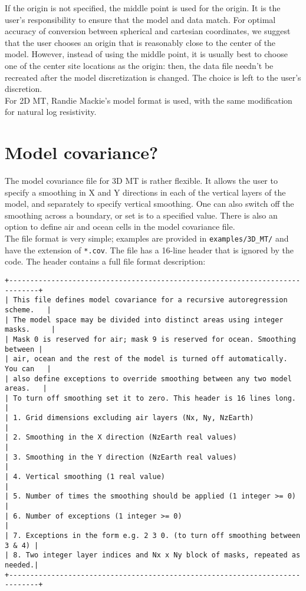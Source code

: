 \documentclass[12pt]{article}
\begin{document}
If the origin is not specified, the middle point is used for the origin. It is the user's responsibility to ensure that the model and data match. For optimal accuracy of conversion between spherical and cartesian coordinates, we suggest that the user chooses an origin that is reasonably close to the center of the model. However, instead of using the middle point, it is usually best to choose one of the center site locations as the origin: then, the data file needn't be recreated after the model discretization is changed. The choice is left to the user's discretion.\\

For 2D MT, Randie Mackie's model format is used, with the same modification for natural log resistivity.

\section{Model covariance?}

The model covariance file for 3D MT is rather flexible. It allows the user to specify a smoothing in X and Y directions in each of the vertical layers of the model, and separately to specify vertical smoothing. One can also switch off the smoothing across a boundary, or set is to a specified value. There is also an option to define air and ocean cells in the model covariance file.\\

The file format is very simple; examples are provided in \verb"examples/3D_MT/" and have the extension of \verb"*.cov". The file has a 16-line header that is ignored by the code. The header contains a full file format description:
\begin{verbatim}
+-----------------------------------------------------------------------------+
| This file defines model covariance for a recursive autoregression scheme.   |
| The model space may be divided into distinct areas using integer masks.     |
| Mask 0 is reserved for air; mask 9 is reserved for ocean. Smoothing between |
| air, ocean and the rest of the model is turned off automatically. You can   |
| also define exceptions to override smoothing between any two model areas.   |
| To turn off smoothing set it to zero. This header is 16 lines long.         |
| 1. Grid dimensions excluding air layers (Nx, Ny, NzEarth)                   |
| 2. Smoothing in the X direction (NzEarth real values)                       |
| 3. Smoothing in the Y direction (NzEarth real values)                       |
| 4. Vertical smoothing (1 real value)                                        |
| 5. Number of times the smoothing should be applied (1 integer >= 0)         |
| 6. Number of exceptions (1 integer >= 0)                                    |
| 7. Exceptions in the form e.g. 2 3 0. (to turn off smoothing between 3 & 4) |
| 8. Two integer layer indices and Nx x Ny block of masks, repeated as needed.|
+-----------------------------------------------------------------------------+
\end{verbatim}
\end{document}
